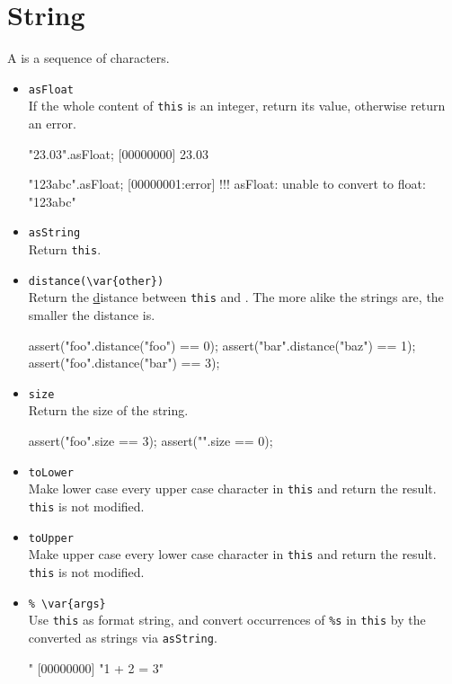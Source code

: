 \section{String}

A  is a sequence of characters.

\begin{itemize}
\item \lstinline|asFloat|\\
  If the whole content of \lstinline|this| is an integer, return its
  value, otherwise return an error.
\begin{urbiscript}
"23.03".asFloat;
[00000000] 23.03

"123abc".asFloat;
[00000001:error] !!! asFloat: unable to convert to float: "123abc"
\end{urbiscript}

\item \lstinline|asString|\\
  Return \lstinline|this|.

\item \lstinline|distance(\var{other})|\\
  Return the
  \href{http://en.wikipedia.org/wiki/Damerau-Levenshtein_distance,
    Damerau-Levenshtein} distance between \lstinline|this| and
  .  The more alike the strings are, the smaller the
  distance is.
\begin{urbiscript}
assert("foo".distance("foo") == 0);
assert("bar".distance("baz") == 1);
assert("foo".distance("bar") == 3);
\end{urbiscript}

\item \lstinline|size|\\
  Return the size of the string.
\begin{urbiscript}
assert("foo".size == 3);
assert("".size == 0);
\end{urbiscript}

\item \lstinline|toLower|\\
  Make lower case every upper case character in \lstinline|this| and
  return the result.  \lstinline|this| is not modified.

\item \lstinline|toUpper|\\
  Make upper case every lower case character in \lstinline|this| and
  return the result.  \lstinline|this| is not modified.

\item \lstinline|% \var{args}|\\
  Use \lstinline|this| as format string, and convert occurrences of
  \lstinline|%s| in \lstinline|this| by the  converted as
  strings via \lstinline|asString|.
\begin{urbiscript}
"%
[00000000] "1 + 2 = 3"
\end{urbiscript}


\end{itemize}
